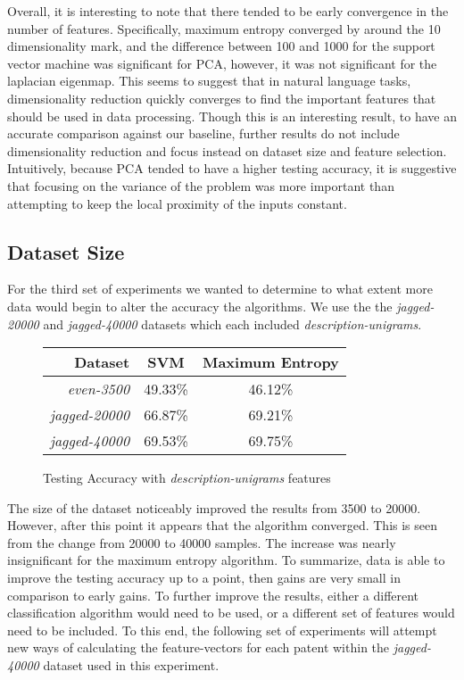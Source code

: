 Overall, it is interesting to note that there tended to be early convergence in the number of features.  Specifically, maximum entropy converged by around the 10 dimensionality mark, and the difference between 100 and 1000 for the support vector machine was significant for PCA, however, it was not significant for the laplacian eigenmap.  This seems to suggest that in natural language tasks, dimensionality reduction quickly converges to find the important features that should be used in data processing.  Though this is an interesting result, to have an accurate comparison against our baseline, further results do not include dimensionality reduction and focus instead on dataset size and feature selection.  Intuitively, because PCA tended to have a higher testing accuracy, it is suggestive that focusing on the variance of the problem was more important than attempting to keep the local proximity of the inputs constant.

\subsection{Dataset Size}
For the third set of experiments we wanted to determine to what extent more data would begin to alter the accuracy the algorithms.  We use the the \emph{jagged-20000} and \emph{jagged-40000} datasets which each included \emph{description-unigrams}.

\begin{figure}[!h]
\begin{center}
\caption{Testing Accuracy with \emph{description-unigrams} features}
\begin{tabular}{| r | c | c |}
\hline
\textbf{Dataset} & \textbf{SVM} & \textbf{Maximum Entropy} \\ \hline
\emph{even-3500} & 49.33\% & 46.12\% \\ \hline
\emph{jagged-20000} & 66.87\% & 69.21\% \\ \hline
\emph{jagged-40000} & 69.53\% & 69.75\% \\ \hline
\end{tabular}
\end{center}
\end{figure}

The size of the dataset noticeably improved the results from 3500 to 20000.  However, after this point it appears that the algorithm converged.  This is seen from the change from 20000 to 40000 samples.  The increase was nearly insignificant for the maximum entropy algorithm.  To summarize, data is able to improve the testing accuracy up to a point, then gains are very small in comparison to early gains.  To further improve the results, either a different classification algorithm would need to be used, or a different set of features would need to be included.  To this end, the following set of experiments will attempt new ways of calculating the feature-vectors for each patent within the \emph{jagged-40000} dataset used in this experiment.

